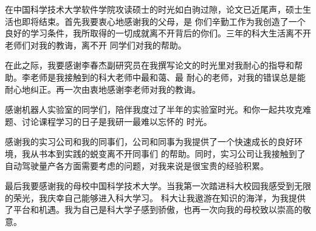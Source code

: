 
\begin{acknowledgements}
在中国科学技术大学软件学院攻读硕士的时光如白驹过隙，论文已近尾声，硕士生活也即将结束。首先我要衷心地感谢我的父母，是
你们辛勤工作为我创造了一个良好的学习条件，我所取得的一切成就离不开背后的你们。三年的科大生活离不开老师们对我的教诲，离不开
同学们对我的帮助。

在此之际，我要感谢李春杰副研究员在我撰写论文的时光里对我耐心的指导和帮助。李老师是我接触到的科大老师中最和蔼、最
耐心的老师，对我的错误总是能耐心地纠正。再一次由衷地感谢李老师对我的教诲。

感谢机器人实验室的同学们，陪伴我度过了半年的实验室时光。和你一起共攻克难题、讨论课程学习的日子是我研一最难以忘怀的
时光。

感谢我的实习公司和我的同事们，公司和同事为我提供了一个快速成长的良好环境，我从书本到实践的蜕变离不开同事们
的帮助。同时，实习公司让我接触到了自动驾驶量产各方面需要考虑的问题，对我来说是很宝贵的经验积累。

最后我要感谢我的母校中国科学技术大学。当我第一次踏进科大校园我感受到无限的荣光，我庆幸自己能够进入科大学习。
科大让我遨游在知识的海洋，为我提供了平台和机遇。我为自己是科大学子感到骄傲，也再一次向我的母校致以崇高的敬意。

\end{acknowledgements}
